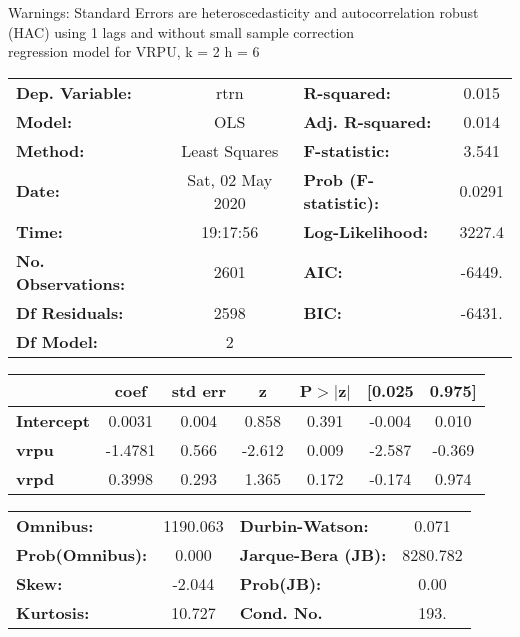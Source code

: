 Warnings: \newline
 [1] Standard Errors are heteroscedasticity and autocorrelation robust (HAC) using 1 lags and without small sample correction\\ 

regression model for VRPU, k = 2 h = 6\begin{center}
\begin{tabular}{lclc}
\toprule
\textbf{Dep. Variable:}    &       rtrn       & \textbf{  R-squared:         } &     0.015   \\
\textbf{Model:}            &       OLS        & \textbf{  Adj. R-squared:    } &     0.014   \\
\textbf{Method:}           &  Least Squares   & \textbf{  F-statistic:       } &     3.541   \\
\textbf{Date:}             & Sat, 02 May 2020 & \textbf{  Prob (F-statistic):} &   0.0291    \\
\textbf{Time:}             &     19:17:56     & \textbf{  Log-Likelihood:    } &    3227.4   \\
\textbf{No. Observations:} &        2601      & \textbf{  AIC:               } &    -6449.   \\
\textbf{Df Residuals:}     &        2598      & \textbf{  BIC:               } &    -6431.   \\
\textbf{Df Model:}         &           2      & \textbf{                     } &             \\
\bottomrule
\end{tabular}
\begin{tabular}{lcccccc}
                   & \textbf{coef} & \textbf{std err} & \textbf{z} & \textbf{P$> |$z$|$} & \textbf{[0.025} & \textbf{0.975]}  \\
\midrule
\textbf{Intercept} &       0.0031  &        0.004     &     0.858  &         0.391        &       -0.004    &        0.010     \\
\textbf{vrpu}      &      -1.4781  &        0.566     &    -2.612  &         0.009        &       -2.587    &       -0.369     \\
\textbf{vrpd}      &       0.3998  &        0.293     &     1.365  &         0.172        &       -0.174    &        0.974     \\
\bottomrule
\end{tabular}
\begin{tabular}{lclc}
\textbf{Omnibus:}       & 1190.063 & \textbf{  Durbin-Watson:     } &    0.071  \\
\textbf{Prob(Omnibus):} &   0.000  & \textbf{  Jarque-Bera (JB):  } & 8280.782  \\
\textbf{Skew:}          &  -2.044  & \textbf{  Prob(JB):          } &     0.00  \\
\textbf{Kurtosis:}      &  10.727  & \textbf{  Cond. No.          } &     193.  \\
\bottomrule
\end{tabular}
\end{center}

